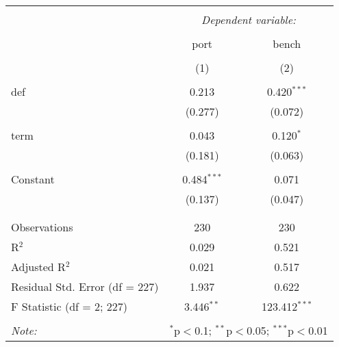 
\begin{table}[!htbp] \centering 
  \caption{} 
  \label{} 
\begin{tabular}{@{\extracolsep{5pt}}lcc} 
\\[-1.8ex]\hline 
\hline \\[-1.8ex] 
 & \multicolumn{2}{c}{\textit{Dependent variable:}} \\ 
\cline{2-3} 
\\[-1.8ex] & port & bench \\ 
\\[-1.8ex] & (1) & (2)\\ 
\hline \\[-1.8ex] 
 def & 0.213 & 0.420$^{***}$ \\ 
  & (0.277) & (0.072) \\ 
  & & \\ 
 term & 0.043 & 0.120$^{*}$ \\ 
  & (0.181) & (0.063) \\ 
  & & \\ 
 Constant & 0.484$^{***}$ & 0.071 \\ 
  & (0.137) & (0.047) \\ 
  & & \\ 
\hline \\[-1.8ex] 
Observations & 230 & 230 \\ 
R$^{2}$ & 0.029 & 0.521 \\ 
Adjusted R$^{2}$ & 0.021 & 0.517 \\ 
Residual Std. Error (df = 227) & 1.937 & 0.622 \\ 
F Statistic (df = 2; 227) & 3.446$^{**}$ & 123.412$^{***}$ \\ 
\hline 
\hline \\[-1.8ex] 
\textit{Note:}  & \multicolumn{2}{r}{$^{*}$p$<$0.1; $^{**}$p$<$0.05; $^{***}$p$<$0.01} \\ 
\end{tabular} 
\end{table} 
